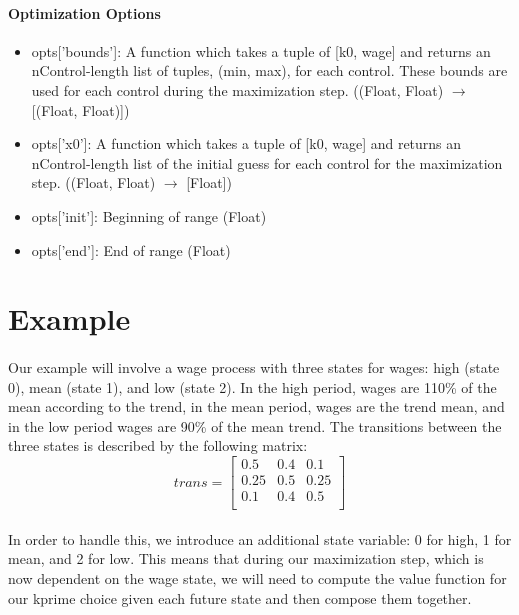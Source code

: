 \documentclass[11pt]{article}
\begin{document}
\paragraph{Optimization Options}

\begin{itemize}
\item opts['bounds']: A function which takes a tuple of [k0, wage] and returns an nControl-length list of tuples, (min, max), for each control. These bounds are used for each control during the maximization step. ((Float, Float) $\rightarrow$ [(Float, Float)])
\item opts['x0']: A function which takes a tuple of [k0, wage] and returns an nControl-length list of the initial guess for each control for the maximization step. ((Float, Float) $\rightarrow$ [Float])
\item opts['init']: Beginning of range (Float)
\item opts['end']: End of range (Float)
\end{itemize}
\clearpage
\section{Example}

\paragraph{} Our example will involve a wage process with three states for wages: high (state 0), mean (state 1), and low (state 2). In the high period, wages are 110\% of the mean according to the trend, in the mean period, wages are the trend mean, and in the low period wages are 90\% of the mean trend. The transitions between the three states is described by the following matrix: 
\[ trans = \begin{bmatrix}
	0.5 & 0.4 & 0.1\\
	0.25 & 0.5 & 0.25\\
	0.1 & 0.4 & 0.5\\
\end{bmatrix}
\]
\paragraph{} In order to handle this, we introduce an additional state variable: 0 for high, 1 for mean, and 2 for low. This means that during our maximization step, which is now dependent on the wage state, we will need to compute the value function for our kprime choice given each future state and then compose them together.
\end{document}
